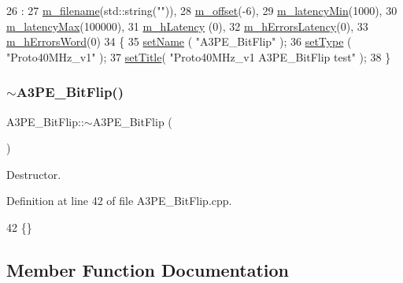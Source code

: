\begin{DoxyCode}
26                              :
27   \hyperlink{classA3PE__BitFlip_a72eecaff11d66c7f3eee10a9b2bfa301}{m\_filename}(std::string(\textcolor{stringliteral}{""})),
28   \hyperlink{classA3PE__BitFlip_ac0797dd65b1aeab96647d795e2f1a447}{m\_offset}(-6),
29   \hyperlink{classA3PE__BitFlip_aeae11ece90351542cae8e0590d9162ee}{m\_latencyMin}(1000),
30   \hyperlink{classA3PE__BitFlip_adfeac5a7ab09d89f0d0146113dd55dde}{m\_latencyMax}(100000),
31   \hyperlink{classA3PE__BitFlip_a83928ea28c555c19f4e95cf7863c1b0c}{m\_hLatency} (0),
32   \hyperlink{classA3PE__BitFlip_a4dec854e8123271c9a624ca46c50dfd5}{m\_hErrorsLatency}(0),
33   \hyperlink{classA3PE__BitFlip_a0d9ea71af465c060689be4c05cba9a8e}{m\_hErrorsWord}(0)
34 \{
35   \hyperlink{classObject_ae30fea75683c2d149b6b6d17c09ecd0c}{setName} ( \textcolor{stringliteral}{"A3PE\_BitFlip"} );
36   \hyperlink{classObject_aae534cc9d982bcb9b99fd505f2e103a5}{setType} ( \textcolor{stringliteral}{"Proto40MHz\_v1"} );
37   \hyperlink{classObject_a89557dbbad5bcaa02652f5d7fa35d20f}{setTitle}( \textcolor{stringliteral}{"Proto40MHz\_v1 A3PE\_BitFlip test"} );
38 \}
\end{DoxyCode}
\mbox{\label{classA3PE__BitFlip_ab58f69a2c8d342bcad937b1dbc0bb3ed}} 
\subsubsection{\texorpdfstring{$\sim$\+A3\+P\+E\+\_\+\+Bit\+Flip()}{~A3PE\_BitFlip()}}
{\footnotesize\ttfamily A3\+P\+E\+\_\+\+Bit\+Flip\+::$\sim$\+A3\+P\+E\+\_\+\+Bit\+Flip (\begin{DoxyParamCaption}{ }\end{DoxyParamCaption})\hspace{0.3cm}{\ttfamily [virtual]}}



Destructor. 



Definition at line 42 of file A3\+P\+E\+\_\+\+Bit\+Flip.\+cpp.


\begin{DoxyCode}
42 \{\}
\end{DoxyCode}


\subsection{Member Function Documentation}
\mbox{\label{classA3PE__BitFlip_ac0d0747dfdd99084dd5524fea62f11d6}} 
